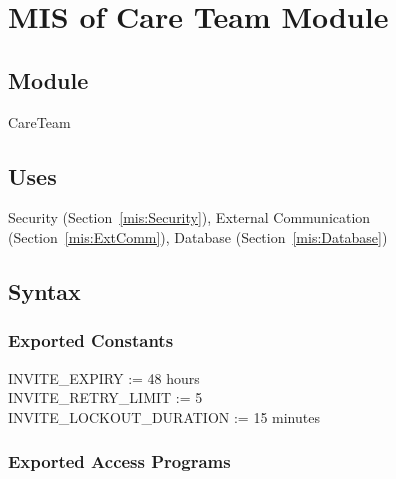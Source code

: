 \documentclass[12pt, titlepage]{article}
\newcommand{\Mref}[1]{Section~\ref{#1}}
\begin{document}
\newpage

\section{MIS of Care Team Module} \label{mis:CareTeam}

\subsection{Module}

CareTeam

\subsection{Uses}

Security (\Mref{mis:Security}), External Communication
(\Mref{mis:ExtComm}), Database (\Mref{mis:Database})

\subsection{Syntax}

\subsubsection{Exported Constants}

INVITE\_EXPIRY := 48 hours \\
INVITE\_RETRY\_LIMIT := 5 \\
INVITE\_LOCKOUT\_DURATION := 15 minutes

\subsubsection{Exported Access Programs}
\end{document}
